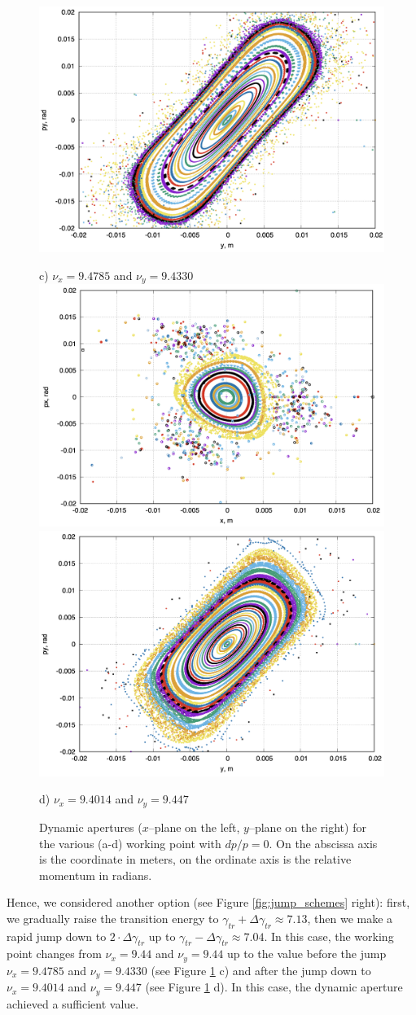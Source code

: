 \documentclass[a4paper,
               keeplastbox,   %
               ]{jacow}
\begin{document}
\begin{figure}[!htb]
    \includegraphics*[width=.493\columnwidth]{img/WEPOPT004_f2-6}\\
    \par c) $\nu_{x}=9.4785$ and $\nu_{y}=9.4330$
    \includegraphics*[width=.493\columnwidth]{img/WEPOPT004_f2-7}
    \includegraphics*[width=.493\columnwidth]{img/WEPOPT004_f2-8}\\
    \par d) $\nu_{x}=9.4014$ and $\nu_{y}=9.447$
   \caption{Dynamic apertures ($x$–plane on the left, $y$–plane on the right) for the various (a-d) working point with $dp/p=0$. On the abscissa axis is the coordinate in meters, on the ordinate axis is the relative momentum in radians.}
   \label{fig:dyn_apertupes}
\end{figure}

\par Hence, we considered another option (see Figure \ref{fig:jump_schemes} right): first, we gradually raise the transition energy to $\gamma_{tr}+\Delta\gamma_{tr}\approx7.13$, then we make a rapid jump down to $2\cdot\Delta\gamma_{tr}$ up to $\gamma_{tr}-\Delta\gamma_{tr}\approx7.04$. In this case, the working point changes from $\nu_{x}=9.44$ and $\nu_{y}=9.44$  up to the value before the jump $\nu_{x}=9.4785$ and $\nu_{y}=9.4330$ (see Figure \ref{fig:dyn_apertupes} c) and after the jump down to $\nu_{x}=9.4014$ and $\nu_{y}=9.447$ (see Figure \ref{fig:dyn_apertupes} d). In this case, the dynamic aperture achieved a sufficient value.
\end{document}
